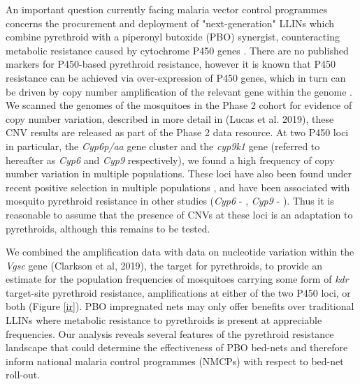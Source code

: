 \documentclass[a4paper,11pt,abstracton,hidelinks]{scrartcl}
\begin{document}
%
An important question currently facing malaria vector control programmes concerns the procurement and deployment of "next-generation" LLINs which combine pyrethroid with a piperonyl butoxide (PBO) synergist, counteracting metabolic resistance caused by cytochrome P450 genes \cite{churcher2016, killeen2018, toe2018}.
%
There are no published markers for P450-based pyrethroid resistance, however it is known that P450 resistance can be achieved via over-expression of P450 genes, which in turn can be driven by copy number amplification of the relevant gene within the genome \cite{riveron2014, muller2008}.
%
We scanned the genomes of the mosquitoes in the Phase 2 cohort for evidence of copy number variation, described in more detail in (Lucas et al. 2019), these CNV results are released as part of the Phase 2 data resource.
%
At two P450 loci in particular, the \textit{Cyp6p/aa} gene cluster and the \textit{cyp9k1} gene (referred to hereafter as \textit{Cyp6} and \textit{Cyp9} respectively), we found a high frequency of copy number variation in multiple populations.
%
These loci have also been found under recent positive selection in multiple populations \cite{Ag1000gConsortium2017}, and have been associated with mosquito pyrethroid resistance in other studies (\textit{Cyp6} - \cite{nikou2003, edi2014, faucon2015, main2018}, \textit{Cyp9} - \cite{main2018, tchigossou2018, vontas2018}).
%
Thus it is reasonable to assume that the presence of CNVs at these loci is an adaptation to pyrethroids, although this remains to be tested.


We combined the amplification data with data on nucleotide variation within the \textit{Vgsc} gene (Clarkson et al, 2019), the target for pyrethroids, to provide an estimate for the population frequencies of mosquitoes carrying some form of \textit{kdr} target-site pyrethroid resistance, amplifications at either of the two P450 loci, or both (Figure \ref{ir}). 
%
PBO impregnated nets may only offer benefits over traditional LLINs where metabolic resistance to pyrethroids is present at appreciable frequencies.
%
Our analysis reveals several features of the pyrethroid resistance landscape that could determine the effectiveness of PBO bed-nets and therefore inform national malaria control programmes (NMCPs) with respect to bed-net roll-out.


\end{document}
